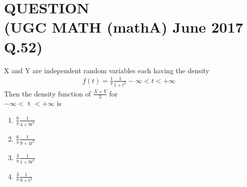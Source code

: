 \documentclass[journal,12pt,twocolumn]{IEEEtran}
\begin{document}
\section*{QUESTION\\(UGC MATH (mathA) June 2017 Q.52)}
X and Y are independent random variables each having the density
\begin{align}
    f(t) = \displaystyle\frac{1}{\pi} \frac{1}{1+{t}^2} -\infty < t < +\infty
\end{align}
Then the density function of $\displaystyle\frac{X+Y}{3}$ for \\$-\infty <$ t $< +\infty$ is\bigskip
    \begin{enumerate}\itemsep0.5cm
        \item $\displaystyle\frac{6}{\pi} \frac{1}{4+9{t}^2}$
        \item $\displaystyle\frac{6}{\pi} \frac{1}{9+4{t}^2}$
        \item $\displaystyle\frac{3}{\pi} \frac{1}{1+9{t}^2}$
        \item $\displaystyle\frac{3}{\pi} \frac{1}{9+{t}^2}$
    \end{enumerate}
\end{document}
